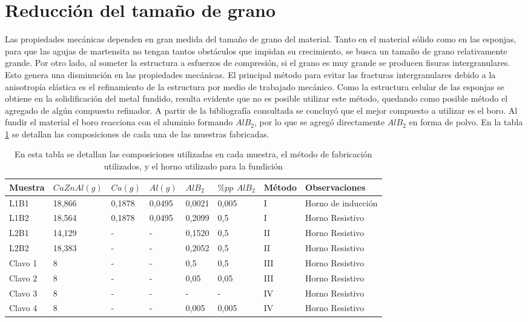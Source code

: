 \documentclass[a4paper,12pt,fleqn,twoside,openany]{book}
\begin{document}
\section{Reducción del tamaño de grano} \label{FabClavos}


Las propiedades mecánicas dependen en gran medida del tamaño de grano del material. Tanto en el material sólido como en las esponjas, para que las agujas de martensita no tengan tantos obstáculos que impidan su crecimiento, se busca un tamaño de grano relativamente grande. Por otro 
lado, al someter la estructura a esfuerzos de compresión, si el grano es muy grande se producen fisuras intergranulares. Esto genera 
una disminución en las propiedades mecánicas. El principal método para evitar las fracturas intergranulares debido a la anisotropía elástica es el refinamiento de la estructura por medio de trabajado mecánico. Como la estructura 
celular de las esponjas se obtiene en la solidificación del metal fundido, resulta evidente que no es posible utilizar este método, quedando como posible método el agregado de algún compuesto refinador. A partir de la bibliografía consultada se concluyó que el 
mejor compuesto a utilizar es el boro. Al fundir el material el boro reacciona con el aluminio formando $AlB_2$, por lo que se agregó directamente $AlB_2$ en forma de polvo. En la tabla \ref{tab:FabMuestras} se detallan las composiciones de cada una de las muestras fabricadas. 

\begin{table} %
\begin{center}
\begin{tabular}{@{}llllllll@{}}  \toprule
Muestra & $CuZnAl (g)$ & $Cu (g)$ & $Al (g)$ & $AlB_2$ & $\% pp$ $AlB_2$ & Método & Observaciones \\ \midrule
L1B1 & 18,866  & 0,1878 & 0,0495 & 0,0021 & 0,005 & I & Horno de inducción\\
L1B2 & 18,564  & 0,1878 & 0,0495 & 0,2099 & 0,5 & I &Horno Resistivo\\
L2B1 & 14,129  & - & -  & 0,1520 & 0,5 & II &Horno Resistivo \\
L2B2 & 18,383 & - & -  & 0,2052 & 0,5 &II & Horno Resistivo \\
Clavo 1 & 8 & - & - & 0,5 & 0,5 & III & Horno Resistivo \\
Clavo 2 & 8 & - & - & 0,05 & 0,05 &III & Horno Resistivo \\
Clavo 3 & 8 & - & - & - & - &  IV & Horno Resistivo \\
Clavo 4 & 8 & - & - & 0,005 & 0,005 &IV & Horno Resistivo \\
\bottomrule
\end{tabular}
\caption{En esta tabla se detallan las composiciones utilizadas en cada muestra, el método de fabricación utilizados, y el horno utilizado para la fundición}
\label{tab:FabMuestras}
\end{center}
\end{table}
\end{document}
